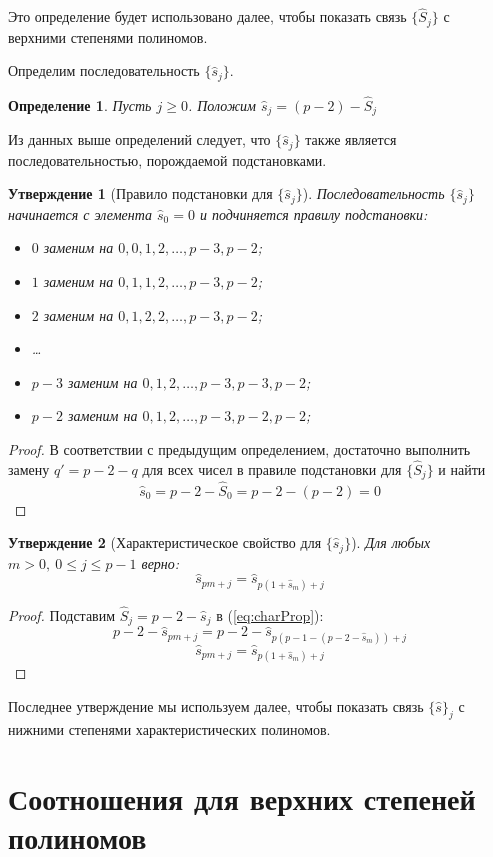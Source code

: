 \documentclass[14pt, a4paper, russian]{report}
\newtheorem{definition}{\indent Определение}
\newtheorem{proposition}{\indent Утверждение}
\begin{document}
Это определение будет использовано далее, чтобы показать связь $\{\hat{S}_j\}$ с верхними степенями полиномов.

Определим последовательность $\{\hat{s}_j\}$.
\begin{definition}\label{small_s}
Пусть $j \ge 0$. Положим $\hat{s}_j = (p-2)-\hat{S}_j$
\end{definition}

Из данных выше определений следует, что $\{\hat{s}_j\}$ также является последовательностью, порождаемой подстановками.

\begin{proposition}[Правило подстановки для $\{\hat{s}_j\}$]
Последовательность $\{\hat{s}_j\}$ начинается с элемента $\hat{s}_0=0$ и подчиняется правилу подстановки:
\begin{itemize}
 \item $0$ заменим на $0, 0, 1, 2, \ldots, p-3, p-2$;
 \item $1$ заменим на $0, 1, 1, 2, \ldots, p-3, p-2$;
 \item $2$ заменим на $0, 1, 2, 2, \ldots, p-3, p-2$;
 \item \ldots
 \item $p-3$ заменим на $0, 1, 2, \ldots, p-3, p-3, p-2$;
 \item $p-2$ заменим на $0, 1, 2, \ldots, p-3, p-2, p-2$;
 \end{itemize}
\end{proposition}
\begin{proof}
В соответствии с предыдущим определением, достаточно выполнить замену $q' = p-2-q$ для всех чисел в правиле подстановки для $\{\hat{S}_j\}$ и найти $$\hat{s}_0 = p-2-\hat{S}_0 = p-2 - (p-2) = 0$$
\end{proof}

\begin{proposition}[Характеристическое свойство для $\{\hat{s}_j\}$]
Для любых $m > 0,\ 0 \le j \le p-1$ верно: $$\hat{s}_{pm+j}=\hat{s}_{p(1+\hat{s}_m) + j}$$
\end{proposition}
\begin{proof}
Подставим $\hat{S}_j = p-2-\hat{s}_j$ в (\ref{eq:charProp}):
$$p-2-\hat{s}_{pm+j}=p-2-\hat{s}_{p(p-1-(p-2-\hat{s}_m)) + j}$$
$$\hat{s}_{pm+j} = \hat{s}_{p(1+\hat{s}_m)+j}$$
\end{proof}

Последнее утверждение мы используем далее, чтобы показать связь $\{\hat{s}\}_j$ с нижними степенями характеристических полиномов.

\section{Соотношения для верхних степеней полиномов}
\end{document}
